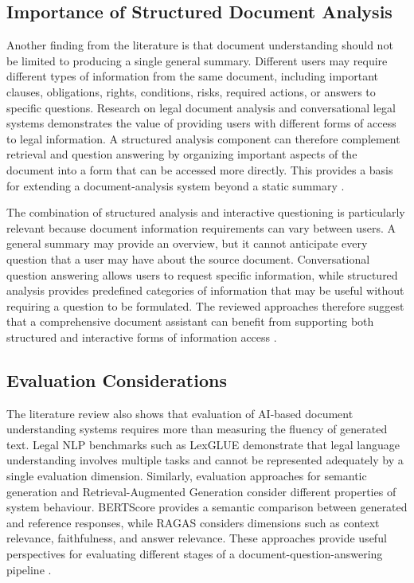 \documentclass[12pt,a4paper,oneside]{report}
\begin{document}
\subsection{Importance of Structured Document Analysis}

Another finding from the literature is that document understanding should not
be limited to producing a single general summary. Different users may require
different types of information from the same document, including important
clauses, obligations, rights, conditions, risks, required actions, or answers
to specific questions. Research on legal document analysis and conversational
legal systems demonstrates the value of providing users with different forms
of access to legal information. A structured analysis component can therefore
complement retrieval and question answering by organizing important aspects of
the document into a form that can be accessed more directly. This provides a
basis for extending a document-analysis system beyond a static summary
\cite{nethriya2024,kandula2023,trivedi2024}.

The combination of structured analysis and interactive questioning is
particularly relevant because document information requirements can vary
between users. A general summary may provide an overview, but it cannot
anticipate every question that a user may have about the source document.
Conversational question answering allows users to request specific
information, while structured analysis provides predefined categories of
information that may be useful without requiring a question to be formulated.
The reviewed approaches therefore suggest that a comprehensive document
assistant can benefit from supporting both structured and interactive forms of
information access
\cite{kandula2023,nethriya2024}.

\subsection{Evaluation Considerations}

The literature review also shows that evaluation of AI-based document
understanding systems requires more than measuring the fluency of generated
text. Legal NLP benchmarks such as LexGLUE demonstrate that legal language
understanding involves multiple tasks and cannot be represented adequately by
a single evaluation dimension. Similarly, evaluation approaches for semantic
generation and Retrieval-Augmented Generation consider different properties
of system behaviour. BERTScore provides a semantic comparison between
generated and reference responses, while RAGAS considers dimensions such as
context relevance, faithfulness, and answer relevance. These approaches
provide useful perspectives for evaluating different stages of a
document-question-answering pipeline
\cite{chalkidis2022lexglue,es2024ragas}.
\end{document}

